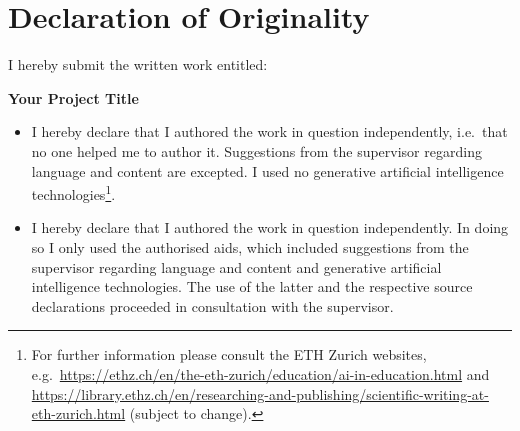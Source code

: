 
\section*{Declaration of Originality}

\vspace{0.5cm}

I hereby submit the written work entitled:

\vspace{0.5cm}

\textbf{Your Project Title}

\vspace{0.25cm}


\begin{itemize}
  \item[$\square$] I hereby declare that I authored the work in question independently, i.e.\ that no one helped me to author it. Suggestions from the supervisor regarding language and content are excepted. I used no generative artificial intelligence technologies\footnote{For further information please consult the ETH Zurich websites, e.g.\ \url{https://ethz.ch/en/the-eth-zurich/education/ai-in-education.html} and \url{https://library.ethz.ch/en/researching-and-publishing/scientific-writing-at-eth-zurich.html} (subject to change).}.
  \item[$\blacksquare$] I hereby declare that I authored the work in question independently. In doing so I only used the authorised aids, which included suggestions from the supervisor regarding language and content and generative artificial intelligence technologies. The use of the latter and the respective source declarations proceeded in consultation with the supervisor.
\end{itemize}

\vspace{0.5cm}

